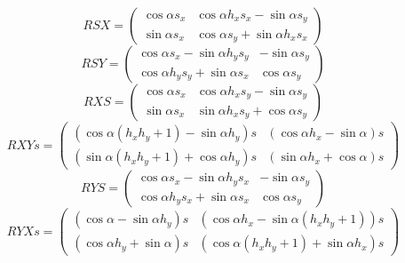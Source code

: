 \[RSX = \begin{pmatrix}\cos\alpha {s_x} & \cos\alpha {h_x} {s_x}-\sin\alpha {s_y}\\
\sin\alpha {s_x} & \cos\alpha {s_y}+\sin\alpha {h_x} {s_x}\end{pmatrix}\]
\[RSY = \begin{pmatrix}\cos\alpha {s_x}-\sin\alpha {h_y} {s_y} & -\sin\alpha {s_y}\\
\cos\alpha {h_y} {s_y}+\sin\alpha {s_x} & \cos\alpha {s_y}\end{pmatrix}\]
\[RXS = \begin{pmatrix}\cos\alpha {s_x} & \cos\alpha {h_x} {s_y}-\sin\alpha {s_y}\\
\sin\alpha {s_x} & \sin\alpha {h_x} {s_y}+\cos\alpha {s_y}\end{pmatrix}\]
\[RXYs = \begin{pmatrix}\left( \cos\alpha \left( {h_x} {h_y}+1\right) -\sin\alpha {h_y}\right)  s & \left( \cos\alpha {h_x}-\sin\alpha\right)  s\\
\left( \sin\alpha \left( {h_x} {h_y}+1\right) +\cos\alpha {h_y}\right)  s & \left( \sin\alpha {h_x}+\cos\alpha\right)  s\end{pmatrix}\]
\[RYS = \begin{pmatrix}\cos\alpha {s_x}-\sin\alpha {h_y} {s_x} & -\sin\alpha {s_y}\\
\cos\alpha {h_y} {s_x}+\sin\alpha {s_x} & \cos\alpha {s_y}\end{pmatrix}\]
\[RYXs = \begin{pmatrix}\left( \cos\alpha-\sin\alpha {h_y}\right)  s & \left( \cos\alpha {h_x}-\sin\alpha \left( {h_x} {h_y}+1\right) \right)  s\\
\left( \cos\alpha {h_y}+\sin\alpha\right)  s & \left( \cos\alpha \left( {h_x} {h_y}+1\right) +\sin\alpha {h_x}\right)  s\end{pmatrix}\]


